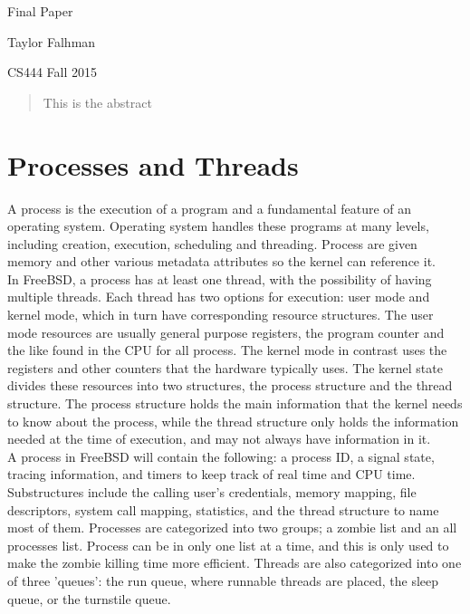 \documentclass[titlepage]{article}
\begin{document}
\begin{titlepage}
\centering
{\Huge Final Paper\par}
{\LARGE Taylor Falhman\par}
{\Large CS444 Fall 2015\par}
\end{titlepage}

\begin{abstract}
\begin{singlespace}
This is the abstract
\end{singlespace}
\end{abstract}

\section{Processes and Threads}
\begin{singlespace}
    A process is the execution of a program and a fundamental feature     of an operating system. Operating system handles these programs at many levels, including creation, execution, scheduling and threading. Process are given memory and other various metadata attributes so the kernel can reference it.\\ 
    In FreeBSD, a process has at least one thread, with the possibility of having multiple threads. Each thread has two options for execution: user mode and kernel mode, which in turn have corresponding resource structures. The user mode resources are usually general purpose registers, the program counter and the like found in the CPU for all process. The kernel mode in contrast uses the registers and other counters that the hardware typically uses. The kernel state divides these resources into two structures, the process structure and the thread structure. The process structure holds the main information that the kernel needs to know about the process, while the thread structure only holds the information needed at the time of execution, and may not always have information in it.\\
    A process in FreeBSD will contain the following: a process ID, a signal state, tracing information, and timers to keep track of real time and CPU time. Substructures include the calling user's credentials, memory mapping, file descriptors, system call mapping, statistics, and the thread structure to name most of them. Processes are categorized into two groups; a zombie list and an all processes list. Process can be in only one list at a time, and this is only used to make the zombie killing time more efficient. Threads are also categorized into one of three 'queues': the run queue, where runnable threads are placed, the sleep queue, or the turnstile queue. \\

\end{singlespace}
\end{document}
